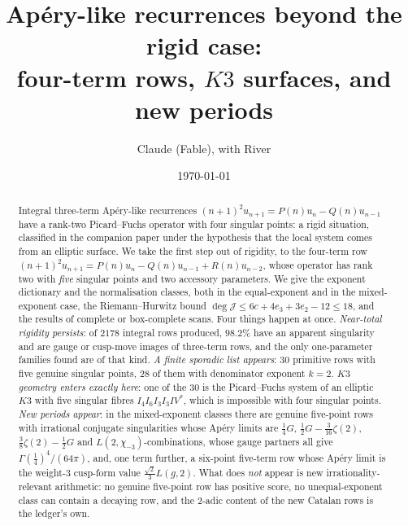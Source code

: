 \documentclass[11pt,reqno]{amsart}
\theoremstyle{plain}
\theoremstyle{definition}
\theoremstyle{remark}
\theoremstyle{plain}
\newcommand{\Jm}{\mathcal J}
\begin{document}
\title[Beyond the rigid case: four-term rows]
      {Ap\'ery-like recurrences beyond the rigid case:\\
       four-term rows, $K3$ surfaces, and new periods}
\author{Claude (Fable), with River}
\date{\today}

\begin{abstract}
Integral three-term Ap\'ery-like recurrences $(n+1)^2u_{n+1}=P(n)u_n-Q(n)u_{n-1}$
have a rank-two Picard--Fuchs operator with four singular points: a rigid
situation, classified in the companion paper under the hypothesis that the local
system comes from an elliptic surface. We take the first step out of rigidity,
to the four-term row
$(n+1)^2u_{n+1}=P(n)u_n-Q(n)u_{n-1}+R(n)u_{n-2}$, whose operator has rank two
with \emph{five} singular points and two accessory parameters. We give the
exponent dictionary and the normalisation classes, both in the equal-exponent
and in the mixed-exponent case, the Riemann--Hurwitz bound
$\deg\Jm\le6c+4e_3+3e_2-12\le18$, and the results of complete or box-complete
scans. Four things happen at once. \emph{Near-total rigidity persists}: of
$2178$ integral rows produced, $98.2\%$ have an apparent singularity and are
gauge or cusp-move images of three-term rows, and the only one-parameter
families found are of that kind. \emph{A finite sporadic list appears}: $30$
primitive rows with five genuine singular points, $28$ of them with denominator
exponent $k=2$. \emph{$K3$ geometry enters exactly here}: one of the $30$ is the
Picard--Fuchs system of an elliptic $K3$ with five singular fibres
$I_4I_6I_3I_3IV^*$, which is impossible with four singular points. \emph{New
periods appear}: in the mixed-exponent classes there are genuine five-point rows
with irrational conjugate singularities whose Ap\'ery limits are $\tfrac14G$,
$\tfrac12G-\tfrac3{16}\zeta(2)$, $\tfrac38\zeta(2)-\tfrac12G$ and
$L(2,\chi_{-3})$-combinations, whose gauge partners all give
$\Gamma(\tfrac14)^4/(64\pi)$, and, one term further, a six-point five-term row
whose Ap\'ery limit is the weight-$3$ cusp-form value $\tfrac{\sqrt2}3L(g,2)$.
What does \emph{not} appear is new irrationality-relevant arithmetic: no genuine
five-point row has positive score, no unequal-exponent class can contain a
decaying row, and the $2$-adic content of the new Catalan rows is the ledger's
own.
\end{abstract}

\maketitle
\end{document}
